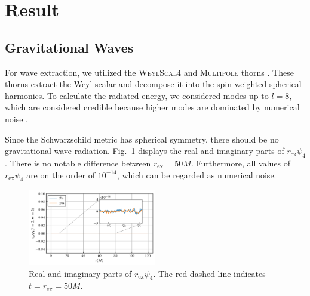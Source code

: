 \documentclass[%
 reprint,
 amsmath,amssymb,
 aps,
 prd,
]{revtex4-2}
\begin{document}
\section{Result}

\subsection{Gravitational Waves}

For wave extraction, we utilized the \textsc{WeylScal4} and \textsc{Multipole} thorns \cite{Baker:2001sf}. These thorns extract the Weyl scalar and decompose it into the spin-weighted spherical harmonics. To calculate the radiated energy, we considered modes up to $l=8$, which are considered credible because higher modes are dominated by numerical noise \cite{Pollney:2009yz}.

Since the Schwarzschild metric has spherical symmetry, there should be no gravitational wave radiation. Fig.~\ref{fig:psi4_r50} displays the real and imaginary parts of $r_\mathrm{ex}\psi_4$. There is no notable difference between $r_\mathrm{ex} = 50M$. Furthermore, all values of $r_\mathrm{ex}\psi_4$ are on the order of $10^{-14}$, which can be regarded as numerical noise.

\begin{figure}[h!]
	\includegraphics[width=0.5\textwidth]{data/psi4_r50.png}%
	\caption{\label{fig:psi4_r50} Real and imaginary parts of $r_\mathrm{ex}\psi_4$. The red dashed line indicates $t=r_\mathrm{ex}=50M$.}
\end{figure}
\end{document}

